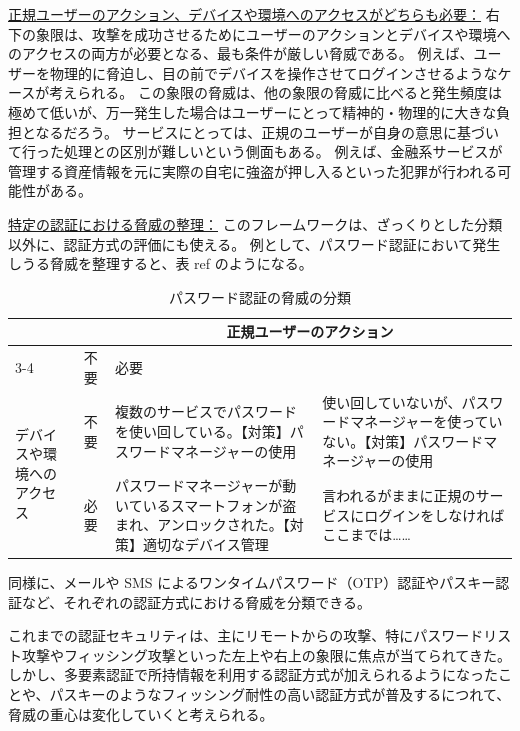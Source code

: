 \documentclass[uplatex]{jsarticle}
\def\ref#1{ref}%
\def\label#1{}%
\begin{document}
\underline{正規ユーザーのアクション、デバイスや環境へのアクセスがどちらも必要：}
右下の象限は、攻撃を成功させるためにユーザーのアクションとデバイスや環境へのアクセスの両方が必要となる、最も条件が厳しい脅威である。
例えば、ユーザーを物理的に脅迫し、目の前でデバイスを操作させてログインさせるようなケースが考えられる。
この象限の脅威は、他の象限の脅威に比べると発生頻度は極めて低いが、万一発生した場合はユーザーにとって精神的・物理的に大きな負担となるだろう。
サービスにとっては、正規のユーザーが自身の意思に基づいて行った処理との区別が難しいという側面もある。
例えば、金融系サービスが管理する資産情報を元に実際の自宅に強盗が押し入るといった犯罪が行われる可能性がある。

\underline{特定の認証における脅威の整理：}
このフレームワークは、ざっくりとした分類以外に、認証方式の評価にも使える。
例として、パスワード認証において発生しうる脅威を整理すると、表 \ref{tab:ch2-password-threats} のようになる。

\begin{table}[H]
\centering
\caption{パスワード認証の脅威の分類}\label{tab:ch2-password-threats}
\begin{tabular}{|p{}|p{}|p{}|p{}|}
\hline
\multicolumn{2}{|c|}{} & \multicolumn{2}{c|}{正規ユーザーのアクション} \\ \cline{3-4}
\multicolumn{2}{|c|}{} & 不要 & 必要 \\ \hline
\multirow{6}{=}{デバイスや環境へのアクセス}
& 不要 & 複数のサービスでパスワードを使い回している。\newline 【対策】パスワードマネージャーの使用 & 使い回していないが、パスワードマネージャーを使っていない。\newline 【対策】パスワードマネージャーの使用 \\ \cline{2-4}
& 必要 & パスワードマネージャーが動いているスマートフォンが盗まれ、アンロックされた。\newline 【対策】適切なデバイス管理 & 言われるがままに正規のサービスにログインをしなければここまでは…… \\ \hline
\end{tabular}
\end{table}

同様に、メールや SMS によるワンタイムパスワード（OTP）認証やパスキー認証など、それぞれの認証方式における脅威を分類できる。

これまでの認証セキュリティは、主にリモートからの攻撃、特にパスワードリスト攻撃やフィッシング攻撃といった左上や右上の象限に焦点が当てられてきた。
しかし、多要素認証で所持情報を利用する認証方式が加えられるようになったことや、パスキーのようなフィッシング耐性の高い認証方式が普及するにつれて、脅威の重心は変化していくと考えられる。
\end{document}

